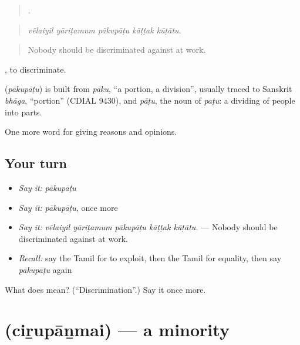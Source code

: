 \begin{quote}
    .
\end{quote}

\begin{quote}
\emph{vēlaiyil yāriṭamum pākupāṭu kāṭṭak kūṭātu.}
\end{quote}

\begin{quote}
Nobody should be discriminated against at work.
\end{quote}

 , to discriminate.

\begin{cousinweb}
\textbf{} (\emph{pākupāṭu}) is built from \emph{pāku}, \textquotedblleft{}a portion, a division\textquotedblright{}, usually traced to Sanskrit \emph{bhāga}, \textquotedblleft{}portion\textquotedblright{} (CDIAL 9430), and \emph{pāṭu}, the noun of \emph{paṭu}: a dividing of people into parts.
\end{cousinweb}

\begin{grammarlens}[title={What you've built}]
One more word for giving reasons and opinions.
\end{grammarlens}

\subsection*{Your turn}
\begin{itemize}
\raggedright
  \item \emph{Say it:} \emph{pākupāṭu}
  \item \emph{Say it:} \emph{pākupāṭu}, once more
  \item \emph{Say it:} \emph{vēlaiyil yāriṭamum pākupāṭu kāṭṭak kūṭātu.} — Nobody should be discriminated against at work.
  \item \emph{Recall:} say the Tamil for to exploit, then the Tamil for equality, then say \emph{pākupāṭu} again
\end{itemize}

\begin{tcolorbox}[breakable,colback=teal!4,colframe=teal!35!black,title={Before you move on}]
What does  mean? (\textquotedblleft{}Discrimination\textquotedblright{}.) Say it once more.
\end{tcolorbox}
\section[\texorpdfstring{\ta{சிறுபான்மை} (ciṟupāṉmai)}{சிறுபான்மை (ciṟupāṉmai)}]{ (ciṟupāṉmai) — a minority}

